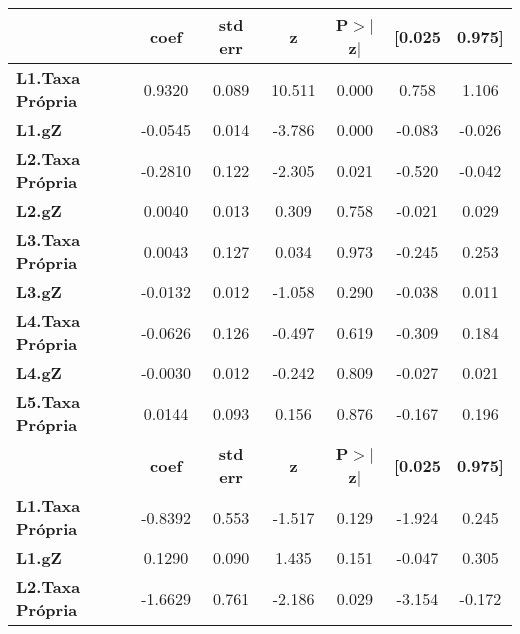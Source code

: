 \begin{center}
\begin{tabular}{lcccccc}
\toprule
                         & \textbf{coef} & \textbf{std err} & \textbf{z} & \textbf{P$> |$z$|$} & \textbf{[0.025} & \textbf{0.975]}  \\
\midrule
\textbf{L1.Taxa Própria} &       0.9320  &        0.089     &    10.511  &         0.000        &        0.758    &        1.106     \\
\textbf{L1.gZ}           &      -0.0545  &        0.014     &    -3.786  &         0.000        &       -0.083    &       -0.026     \\
\textbf{L2.Taxa Própria} &      -0.2810  &        0.122     &    -2.305  &         0.021        &       -0.520    &       -0.042     \\
\textbf{L2.gZ}           &       0.0040  &        0.013     &     0.309  &         0.758        &       -0.021    &        0.029     \\
\textbf{L3.Taxa Própria} &       0.0043  &        0.127     &     0.034  &         0.973        &       -0.245    &        0.253     \\
\textbf{L3.gZ}           &      -0.0132  &        0.012     &    -1.058  &         0.290        &       -0.038    &        0.011     \\
\textbf{L4.Taxa Própria} &      -0.0626  &        0.126     &    -0.497  &         0.619        &       -0.309    &        0.184     \\
\textbf{L4.gZ}           &      -0.0030  &        0.012     &    -0.242  &         0.809        &       -0.027    &        0.021     \\
\textbf{L5.Taxa Própria} &       0.0144  &        0.093     &     0.156  &         0.876        &       -0.167    &        0.196     \\
                         & \textbf{coef} & \textbf{std err} & \textbf{z} & \textbf{P$> |$z$|$} & \textbf{[0.025} & \textbf{0.975]}  \\
\midrule
\textbf{L1.Taxa Própria} &      -0.8392  &        0.553     &    -1.517  &         0.129        &       -1.924    &        0.245     \\
\textbf{L1.gZ}           &       0.1290  &        0.090     &     1.435  &         0.151        &       -0.047    &        0.305     \\
\textbf{L2.Taxa Própria} &      -1.6629  &        0.761     &    -2.186  &         0.029        &       -3.154    &       -0.172     \\

\end{tabular}
\end{center}

